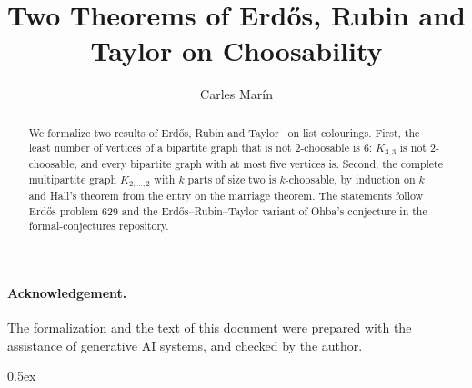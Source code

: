\documentclass[10pt,a4paper]{article}
\begin{document}
\title{Two Theorems of Erd\H{o}s, Rubin and Taylor on Choosability}
\author{Carles Mar\'in}
\maketitle

\begin{abstract}
We formalize two results of Erd\H{o}s, Rubin and Taylor~\cite{ERT1980} on list colourings. First, the least number of vertices of a bipartite graph that is not $2$-choosable is $6$: $K_{3,3}$ is not $2$-choosable, and every bipartite graph with at most five vertices is. Second, the complete multipartite graph $K_{2,\dots,2}$ with $k$ parts of size two is $k$-choosable, by induction on $k$ and Hall's theorem from the entry on the marriage theorem. The statements follow Erd\H{o}s problem 629 and the Erd\H{o}s--Rubin--Taylor variant of Ohba's conjecture in the formal-conjectures repository.
\end{abstract}

\paragraph{Acknowledgement.} The formalization and the text of this document were prepared with the
assistance of generative AI systems, and checked by the author.

\tableofcontents

\parindent 0pt\parskip 0.5ex





\end{document}
